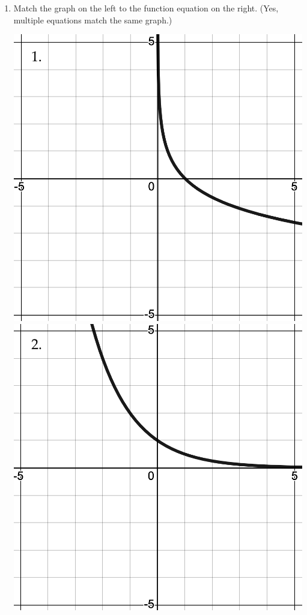 \documentclass[12pt]{article}
\begin{document}
\begin{enumerate}
\begin{multicols}{2}
\begin{enumerate}[itemsep=4cm]
	\item $\displaystyle 25x^{5}=100$
	\end{enumerate}
	\end{multicols}
\vfill
\item Match the graph on the left to the function equation on the right. (Yes, multiple equations match the same graph.)\\
\noindent\begin{minipage}{0.7\textwidth}%
\includegraphics [scale=.15]{3_2_0_gd}
\includegraphics [scale=.15]{3_2_0_gb}\\

\end{minipage}
\end{enumerate}
\end{document}
